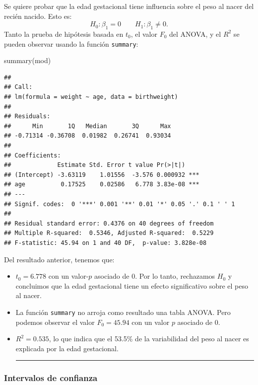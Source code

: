 \documentclass[
]{article}
\newenvironment{Shaded}{\begin{snugshade}}{\end{snugshade}}
\newcommand{\FunctionTok}[1]{\textcolor[rgb]{0.00,0.00,0.00}{#1}}
\newcommand{\NormalTok}[1]{#1}
\providecommand{\tightlist}{%
  \setlength{\itemsep}{0pt}\setlength{\parskip}{0pt}}
\begin{document}
Se quiere probar que la edad gestacional tiene influencia sobre el peso al nacer del recién nacido. Esto es:
\[
H_{0}: \beta_{1} = 0 \qquad H_{1}: \beta_{1} \neq 0. 
\]
Tanto la prueba de hipótesis basada en \(t_{0}\), el valor \(F_{0}\) del ANOVA, y el \(R^{2}\) se pueden observar usando la función \texttt{summary}:

\begin{Shaded}
\begin{Highlighting}[]
\FunctionTok{summary}\NormalTok{(mod)}
\end{Highlighting}
\end{Shaded}

\begin{verbatim}
## 
## Call:
## lm(formula = weight ~ age, data = birthweight)
## 
## Residuals:
##      Min       1Q   Median       3Q      Max 
## -0.71314 -0.36708  0.01982  0.26741  0.93034 
## 
## Coefficients:
##             Estimate Std. Error t value Pr(>|t|)    
## (Intercept) -3.63119    1.01556  -3.576 0.000932 ***
## age          0.17525    0.02586   6.778 3.83e-08 ***
## ---
## Signif. codes:  0 '***' 0.001 '**' 0.01 '*' 0.05 '.' 0.1 ' ' 1
## 
## Residual standard error: 0.4376 on 40 degrees of freedom
## Multiple R-squared:  0.5346, Adjusted R-squared:  0.5229 
## F-statistic: 45.94 on 1 and 40 DF,  p-value: 3.828e-08
\end{verbatim}

Del resultado anterior, tenemos que:

\begin{itemize}
\tightlist
\item
  \(t_{0}=6.778\) con un valor-\(p\) asociado de 0. Por lo tanto, rechazamos \(H_{0}\) y concluimos que la edad gestacional tiene un efecto significativo sobre el peso al nacer.
\item
  La función \texttt{summary} no arroja como resultado una tabla ANOVA. Pero podemos observar el valor \(F_{0} = 45.94\) con un valor \(p\) asociado de 0.
\item
  \(R^{2} = 0.535\), lo que indica que el 53.5\% de la variabilidad del peso al nacer es explicada por la edad gestacional.

  \rule{\textwidth}{0.4pt}
\end{itemize}

\hypertarget{intervalos-de-confianza}{%
\subsubsection{Intervalos de confianza}\label{intervalos-de-confianza}}
\end{document}
